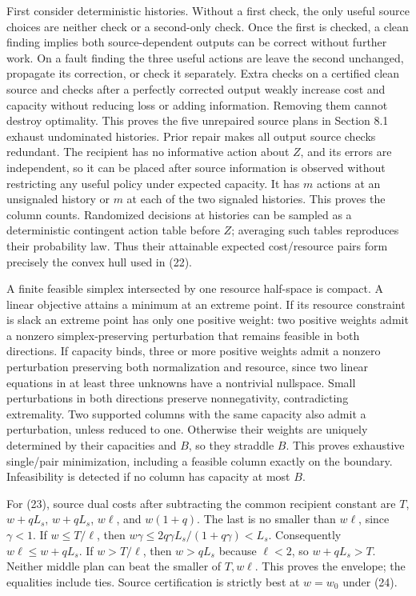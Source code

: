 \documentclass[
  11pt,
  a4paper,
]{article}
\begin{document}
First consider deterministic histories. Without a first check, the only
useful source choices are neither check or a second-only check. Once the
first is checked, a clean finding implies both source-dependent outputs
can be correct without further work. On a fault finding the three useful
actions are leave the second unchanged, propagate its correction, or
check it separately. Extra checks on a certified clean source and checks
after a perfectly corrected output weakly increase cost and capacity
without reducing loss or adding information. Removing them cannot
destroy optimality. This proves the five unrepaired source plans in
Section 8.1 exhaust undominated histories. Prior repair makes all output
source checks redundant. The recipient has no informative action about
\(Z\), and its errors are independent, so it can be placed after source
information is observed without restricting any useful policy under
expected capacity. It has \(m\) actions at an unsignaled history or
\(m\) at each of the two signaled histories. This proves the column
counts. Randomized decisions at histories can be sampled as a
deterministic contingent action table before \(Z\); averaging such
tables reproduces their probability law. Thus their attainable expected
cost/resource pairs form precisely the convex hull used in (22).

A finite feasible simplex intersected by one resource half-space is
compact. A linear objective attains a minimum at an extreme point. If
its resource constraint is slack an extreme point has only one positive
weight: two positive weights admit a nonzero simplex-preserving
perturbation that remains feasible in both directions. If capacity
binds, three or more positive weights admit a nonzero perturbation
preserving both normalization and resource, since two linear equations
in at least three unknowns have a nontrivial nullspace. Small
perturbations in both directions preserve nonnegativity, contradicting
extremality. Two supported columns with the same capacity also admit a
perturbation, unless reduced to one. Otherwise their weights are
uniquely determined by their capacities and \(B\), so they straddle
\(B\). This proves exhaustive single/pair minimization, including a
feasible column exactly on the boundary. Infeasibility is detected if no
column has capacity at most \(B\).

For (23), source dual costs after subtracting the common recipient
constant are \(T\), \(w+qL_s\), \(w+qL_s\), \(w\ell\), and \(w(1+q)\).
The last is no smaller than \(w\ell\), since \(\gamma<1\). If
\(w\leq T/\ell\), then \(w\gamma\leq2q\gamma L_s/(1+q\gamma)<L_s\).
Consequently \(w\ell\leq w+qL_s\). If \(w>T/\ell\), then \(w>qL_s\)
because \(\ell<2\), so \(w+qL_s>T\). Neither middle plan can beat the
smaller of \(T,w\ell\). This proves the envelope; the equalities include
ties. Source certification is strictly best at \(w=w_0\) under (24).
\end{document}
